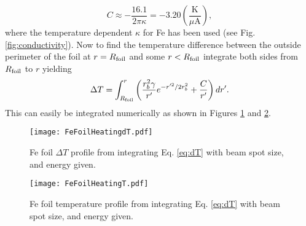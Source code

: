 \documentclass[12pt]{article}
\begin{document}
\[
C\approx-\frac{16.1}{2\pi\kappa}=-3.20\left(\frac{\textrm{K}}{\mu\textrm{A}}\right),
\]
where the temperature dependent $\kappa$ for Fe has been used (see Fig. \ref{fig:conductivity}). Now to find the temperature difference between the outside perimeter of the foil at $r=R_{\rm foil}$ and some $r<R_{\rm foil}$ integrate both sides from $R_{\rm foil}$ to $r$ yielding
\begin{equation}
\label{eq:dT}
\Delta T = \int_{R_{\rm foil}}^r \left(\frac{r_b^2\gamma}{r^{\prime}} e^{-r^{\prime 2}/2r_b^2}+\frac{C}{r^{\prime}}\right)dr^{\prime}.
\end{equation}
This can easily be integrated numerically as shown in Figures  \ref{fig:foilheating} and \ref{fig:foilheatingT}.
\begin{figure}[h]
\centering
\texttt{[image: FeFoilHeatingdT.pdf]}
\caption{\label{fig:foilheating}Fe foil $\Delta T$ profile from integrating Eq. \ref{eq:dT} with beam spot size, and energy given.}
\end{figure}
\begin{figure}[h]
\centering
\texttt{[image: FeFoilHeatingT.pdf]}
\caption{\label{fig:foilheatingT}Fe foil temperature profile from integrating Eq. \ref{eq:dT} with beam spot size, and energy given.}
\end{figure}
\end{document}
